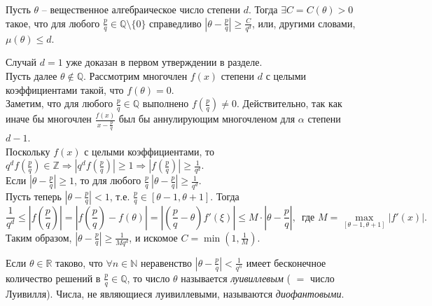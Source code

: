 \begin{theorem}[Лиувилля]  \label{l9_Liouv}
	Пусть $\theta$ -- вещественное алгебраическое число степени $d$. Тогда $\exists C = C(\theta) > 0$ такое, что для любого $\displaystyle \frac{p}{q} \in \mathbb{Q} \setminus \lbrace 0 \rbrace$ справедливо $\displaystyle \left|\theta - \frac{p}{q}\right| \geq \frac{C}{q^d}$, или, другими словами, $\mu(\theta) \leq d$.
\end{theorem}
\begin{pf}
	Случай $d = 1$ уже доказан в первом утверждении в разделе.\\
	Пусть далее $\theta \not \in \mathbb{Q}$. Рассмотрим многочлен $f(x)$ степени $d$ с целыми коэффициентами такой, что $f(\theta) = 0$.\\
	Заметим, что для любого $\displaystyle \frac{p}{q} \in \mathbb{Q}$ выполнено $\displaystyle f\left(\frac{p}{q}\right) \ne 0$. Действительно, так как иначе бы многочлен $\displaystyle \frac{f(x)}{x - \frac{p}{q}}$ был бы аннулирующим многочленом для $\alpha$ степени $d - 1$.\\
	Поскольку $f(x)$ с целыми коэффициентами, то $\displaystyle q^d f\left(\frac{p}{q}\right) \in \mathbb{Z} \Rightarrow \left| q^d f\left(\frac{p}{q}\right) \right| \geq 1 \Rightarrow \left| f\left(\frac{p}{q}\right) \right| \geq \frac{1}{q^d}$.\\
	Если $\displaystyle \left| \theta - \frac{p}{q} \right| \geq 1$, то для любого $\displaystyle \frac{p}{q} \ \left|\theta - \frac{p}{q}\right| \geq \frac{1}{q^d}$.\\
	Пусть теперь $\displaystyle \left|\theta - \frac{p}{q}\right| < 1$, т.е. $\displaystyle \frac{p}{q} \in [\theta - 1, \theta + 1]$. Тогда
	$$\frac{1}{q^d} \leq \left| f\left(\frac{p}{q}\right)\right| = \left|f\left(\frac{p}{q}\right) - f\left(\theta\right)\right| = \left|\left(\frac{p}{q} - \theta\right)f'(\xi)\right| \leq M \cdot \left| \theta - \frac{p}{q} \right|, \, \text{ где } M = \max\limits_{[\theta-1,\theta+1]}\left| f'(x) \right|.$$
	Таким образом, $\displaystyle \left| \theta - \frac{p}{q} \right| \geq \frac{1}{Mq^d}$, и искомое $\displaystyle C = \min\left( 1, \frac{1}{M} \right)$.
\end{pf}

\begin{definition}
	Если $\theta \in \mathbb{R}$ таково, что $\forall n \in \mathbb{N}$ неравенство $\displaystyle \left|\theta - \frac{p}{q}\right| < \frac{1}{q^n}$ имеет бесконечное количество решений в $\displaystyle \frac{p}{q} \in \mathbb{Q}$, то число $\theta$  называется \textit{луивиллевым} ( $=$ число Луивилля). Числа, не являющиеся луивиллевыми, называются \textit{диофантовыми}.
\end{definition}

